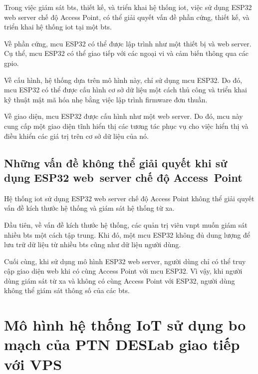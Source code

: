 Trong việc giám sát \acrshort{bts}, thiết kế, và triển khai hệ thống \acrshort{iot}, việc sử dụng ESP32 web server chế độ Access Point, có thể giải quyết vấn đề phần cứng, thiết kế, và triển khai hệ thống \acrshort{iot} tại một \acrshort{bts}.

Về phần cứng, \acrshort{mcu} ESP32 có thể được lập trình như một thiết bị và web server. Cụ thể, \acrshort{mcu} ESP32 có thể giao tiếp với các ngoại vi và cảm biến thông qua các \acrfull{gpio}.

Về cấu hình, hệ thống dựa trên mô hình này, chỉ sử dụng \acrshort{mcu} ESP32. Do đó, \acrshort{mcu} ESP32 có thể được cấu hình cơ sở dữ liệu một cách thủ công và triển khai kỹ thuật mật mã hóa nhẹ bằng việc lập trình firmware đơn thuần.

Về giao diện, \acrshort{mcu} ESP32 được cấu hình như một web server. Do đó, \acrshort{mcu} này cung cấp một giao diện tĩnh hiển thị các tương tác phục vụ cho việc hiển thị và điều khiển các giá trị trên cơ sở dữ liệu của nó.

\subsection{Những vấn đề không thể giải quyết khi sử dụng ESP32 web~server chế độ Access~Point}

Hệ thống \acrshort{iot} sử dụng ESP32 web server chế độ Access Point không thể giải quyết vấn đề kích thước hệ thống và giám sát hệ thống từ xa.

Đầu tiên, về vấn đề kích thước hệ thống, các quản trị viên \acrshort{vnpt} muốn giám sát nhiều \acrshort{bts} một cách tập trung. Khi đó, một \acrshort{mcu} ESP32 không đủ dung lượng để lưu trữ dữ liệu từ nhiều \acrshort{bts} cũng như dữ liệu người dùng.

Cuối cùng, khi sử dụng mô hình ESP32 web server, người dùng chỉ có thể truy cập giao diện web khi có cùng Access Point với \acrshort{mcu} ESP32. Vì vậy, khi người dùng giám sát từ xa và không có cùng Access Point với ESP32, người dùng không thể giám sát thông số của các \acrshort{bts}.

\section{Mô hình hệ thống IoT sử dụng bo mạch của PTN DESLab giao tiếp với VPS}
\label{IoT-system-model-using-DESLab-board-communcating-VPS}

